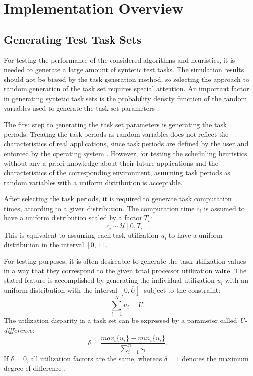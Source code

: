 \chapter{Implementation Overview}
\section{Generating Test Task Sets}
For testing the performance of the considered algorithms and heuristics, it is needed to generate a large amount of syntetic test tasks.
The simulation results should not be biased by the task generation method, so selecting the approach to random generation of the task set requires special attention.
An important factor in generating syntetic task sets is the probability density function of the random variables used to generate the task set parameters \cite{bini2005measuring}.

The first step to generating the task set parameters is generating the task periods.
Treating the task periods as random variables does not reflect the characteristics of real applications, since task periods are defined by the user and enforced by the operating system \cite{bini2005measuring}.
However, for testing the scheduling heuristics without any a priori knowledge about their future applications and the characteristics of the corresponding environment, asuuming task periods as random variables with a uniform distribution is acceptable.

After selecting the task periods, it is required to generate task computation times, according to a given distribution.
The computation time $c_i$ is assumed to have a uniform distribution scaled by a factor $T_i$:
\begin{equation*}
c_i \sim \mathcal{U}[0, T_i].
\end{equation*}
This is equivalent to assuming each task utilization $u_i$ to have a uniform distribution in the interval $[0, 1]$.

For testing purposes, it is often desireable to generate the task utilization values in a way that they correspond to the given total processor utilization value.
The stated feature is accomplished by generating the individual utilization $u_i$ with an uniform distribution with the interval $[0, \overline{U}]$, subject to the constraint:
\begin{equation*}
\sum_{i=1}^{N}u_i = \overline{U}.
\end{equation*}
The utilization disparity in a task set can be expressed by a parameter called \textit{U-difference}:
\begin{equation*}
\delta = \frac{max_i\{u_i\}-min_i\{u_i\}}{\sum_{i=1}^{n}u_i}.
\end{equation*}
If $\delta = 0$, all utilization factors are the same, whereas $\delta=1$ denotes the maximum degree of difference \cite{bini2005measuring}.

